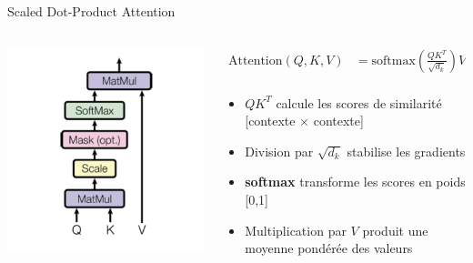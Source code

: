 \documentclass[aspectratio=169]{beamer}
\begin{document}
\begin{frame}{Scaled Dot-Product Attention}
    \begin{columns}
        \begin{column}{0.4\textwidth}
            \begin{center}
                \includegraphics[width=\textwidth]{images/scaled_dot_attn.png}
            \end{center}
        \end{column}
        \begin{column}{0.6\textwidth}
            \begin{align*}
                \text{Attention}(Q, K, V) &= \text{softmax}\left(\frac{QK^T}{\sqrt{d_k}}\right)V \\
            \end{align*}
            \begin{itemize}
                \item $QK^T$ calcule les scores de similarité [contexte × contexte]
                \item Division par $\sqrt{d_k}$ stabilise les gradients
                \item \textbf{softmax} transforme les scores en poids [0,1]
                \item Multiplication par $V$ produit une moyenne pondérée des valeurs
            \end{itemize}
        \end{column}
    \end{columns}
\end{frame}
\end{document}
